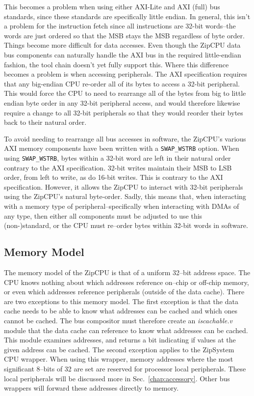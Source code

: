 \documentclass{gqtekspec}
\begin{document}
This becomes a problem when using either AXI-Lite and AXI (full) bus standards,
since these standards are specifically little endian.  In general, this isn't
a problem for the instruction fetch since all instructions are 32-bit
words--the words are just ordered so that the MSB stays the MSB regardless of
byte order.  Things become more difficult for data accesses.  Even though the
ZipCPU data bus components can naturally handle the AXI bus in the required
little-endian fashion, the tool chain doesn't yet fully support this.  Where
this difference becomes a problem is when accessing peripherals.  The AXI
specification requires that any big-endian CPU re-order all of its bytes to
access a 32-bit peripheral.  This would force the CPU to need to rearrange
all of the bytes from big to little endian byte order in any 32-bit peripheral
access, and would therefore likewise require a change to all 32-bit
peripherals so that they would reorder their bytes back to their natural order.

To avoid needing to rearrange all bus accesses in software, the ZipCPU's
various AXI memory components have been written with a {\tt SWAP\_WSTRB} option.
When using {\tt SWAP\_WSTRB}, bytes within a 32-bit word are left in their
natural order contrary to the AXI specification.  32-bit writes maintain their
MSB to LSB order, from left to write, as do 16-bit writes.  This is contrary
to the AXI specification.  However, it allows the ZipCPU to interact with
32-bit peripherals using the ZipCPU's natural byte-order.  Sadly, this means
that, when interacting with a memory type of peripheral--specifically when
interacting with DMAs of any type, then either all components must be adjusted
to use this (non-)standard, or the CPU must re--order bytes within 32-bit words
in software.
\subsection{Memory Model}\label{ssec:memory}
The memory model of the ZipCPU is that of a uniform 32--bit address space.
The CPU knows nothing about which addresses reference on--chip or off-chip
memory, or even which addresses reference peripherals (outside of the data
cache).  There are two exceptions to this memory model.  The first exception
is that the data cache needs to be able to know what addresses can be
cached and which ones cannot be cached.  The bus compositor must therefore
create an {\em iscachable.v} module that the data cache can reference to
know what addresses can be cached.  This module examines addresses, and
returns a bit indicating if values at the given address can be cached.
The second exception applies to the ZipSystem CPU wrapper.  When using this
wrapper, memory addresses where the most significant 8--bits of 32
are set are reserved for processor local peripherals.  These local
peripherals will be discussed more in Sec.~\ref{chap:accessory}.  Other
bus wrappers will forward these addresses directly to memory.
\end{document}
